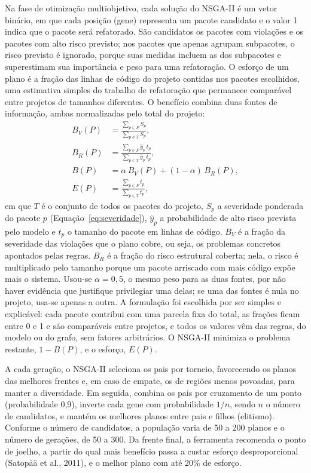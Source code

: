 \documentclass[
  a4paper,
]{article}
\begin{document}
Na fase de otimização multiobjetivo, cada solução do NSGA-II é um vetor binário, em que cada posição (gene) representa um pacote candidato e o valor 1 indica que o pacote será refatorado. São candidatos os pacotes com violações e os pacotes com alto risco previsto; nos pacotes que apenas agrupam subpacotes, o risco previsto é ignorado, porque suas medidas incluem as dos subpacotes e superestimam sua importância e peso para uma refatoração. O esforço de um plano é a fração das linhas de código do projeto contidas nos pacotes escolhidos, uma estimativa simples do trabalho de refatoração que permanece comparável entre projetos de tamanhos diferentes. O benefício combina duas fontes de informação, ambas normalizadas pelo total do projeto:
\begin{align}
  B_V(P) &= \frac{\sum_{p \in P} S_p}{\sum_{p \in T} S_p}, \label{eq:beneficio-violacoes}\\[4pt]
  B_R(P) &= \frac{\sum_{p \in P} \hat{y}_p\,t_p}{\sum_{p \in T} \hat{y}_p\,t_p}, \label{eq:beneficio-risco}\\[4pt]
  B(P) &= \alpha\,B_V(P) + (1-\alpha)\,B_R(P), \label{eq:beneficio}\\[4pt]
  E(P) &= \frac{\sum_{p \in P} t_p}{\sum_{p \in T} t_p}, \label{eq:esforco}
\end{align}
em que $T$ é o conjunto de todos os pacotes do projeto, $S_p$ a severidade ponderada do pacote $p$ (Equação~\ref{eq:severidade}), $\hat{y}_p$ a probabilidade de alto risco prevista pelo modelo e $t_p$ o tamanho do pacote em linhas de código. $B_V$ é a fração da severidade das violações que o plano cobre, ou seja, os problemas concretos apontados pelas regras. $B_R$ é a fração do risco estrutural coberta; nela, o risco é multiplicado pelo tamanho porque um pacote arriscado com mais código expõe mais o sistema. Usou-se $\alpha = 0{,}5$, o mesmo peso para as duas fontes, por não haver evidência que justifique privilegiar uma delas; se uma das fontes é nula no projeto, usa-se apenas a outra. A formulação foi escolhida por ser simples e explicável: cada pacote contribui com uma parcela fixa do total, as frações ficam entre 0 e 1 e são comparáveis entre projetos, e todos os valores vêm das regras, do modelo ou do grafo, sem fatores arbitrários. O NSGA-II minimiza o problema restante, $1 - B(P)$, e o esforço, $E(P)$.

A cada geração, o NSGA-II seleciona os pais por torneio, favorecendo os planos das melhores frentes e, em caso de empate, os de regiões menos povoadas, para manter a diversidade. Em seguida, combina os pais por cruzamento de um ponto (probabilidade 0,9), inverte cada gene com probabilidade $1/n$, sendo $n$ o número de candidatos, e mantém os melhores planos entre pais e filhos (elitismo). Conforme o número de candidatos, a população varia de 50 a 200 planos e o número de gerações, de 50 a 300. Da frente final, a ferramenta recomenda o ponto de joelho, a partir do qual mais benefício passa a custar esforço desproporcional (Satopää et al., 2011), e o melhor plano com até 20\% de esforço.
\end{document}
